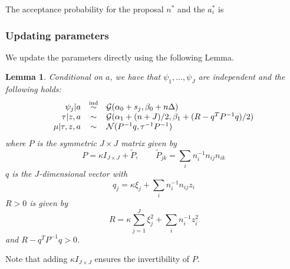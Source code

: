 \documentclass[a4paper,11pt]{article}
\theoremstyle{theorem}
\newtheorem{lem}{Lemma}[section]
\theoremstyle{definition}
\begin{document}
The acceptance probability for the proposal $n^{\ast}$ and the $a_{i}^{\ast}$ is

\subsubsection{Updating parameters}

We update the parameters directly using the following Lemma.

\begin{lem}
Conditional on $a$, we have that $\psi_1, \dotsc, \psi_J$ are independent and the following holds:
\[
\begin{array}{r c l}
\psi_j | a & \overset{\text{ind}}{\sim} & \mathcal{G}(\alpha_0 + s_j, \beta_0 + n\Delta) \\
\tau | z, a & \sim & \mathcal{G}(\alpha_1 + (n+J)/2, \beta_1 + (R - q^T P^{-1} q)/2) \\
\mu | \tau, z, a & \sim & \mathcal{N}(P^{-1} q, \tau^{-1} P^{-1})
\end{array}
\]
where $P$ is the symmetric $J \times J$ matrix given by
\[
P = \kappa I_{J \times J} + \tilde{P}, \qquad \tilde{P}_{jk} = \sum_{i}{n_{i}^{-1} n_{ij} n_{ik}}
\]
$q$ is the $J$-dimensional vector with
\[
q_j = \kappa \xi_j + \sum_{i}{n_{i}^{-1}n_{ij}z_i}
\]
$R > 0$ is given by
\[
R = \kappa \sum_{j=1}^{J}{\xi_{j}^{2}} + \sum_{i}{n_{i}^{-1} z_{i}^{2}}
\]
and $R - q^T P^{-1} q > 0$. 
\end{lem}

Note that adding $\kappa I_{J \times J}$ ensures the invertibility of $P$.
\end{document}
